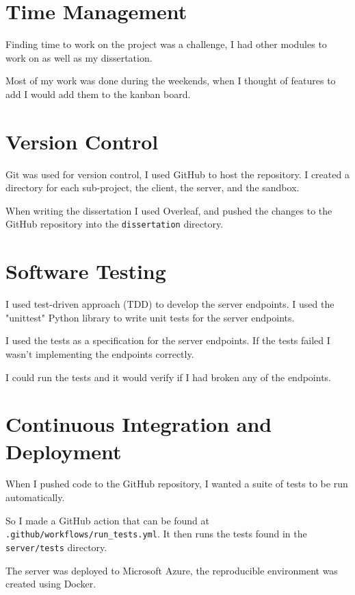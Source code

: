 
\section{Time Management}
Finding time to work on the project was a challenge,
I had other modules to work on as well as my dissertation.

Most of my work was done during the weekends,
when I thought of features to add I would add them to the kanban board.


\section{Version Control}
Git was used for version control, I used GitHub to host the repository.
I created a directory for each sub-project, the client, the server, and the sandbox.

When writing the dissertation I used Overleaf,
and pushed the changes to the GitHub repository into the \texttt{dissertation} directory.



\section{Software Testing}
I used test-driven approach (TDD) to develop the server endpoints.
I used the "unittest" Python library to write unit tests for the server endpoints.

I used the tests as a specification for the server endpoints.
If the tests failed I wasn't implementing the endpoints correctly.

I could run the tests and it would verify if I had broken any of the endpoints.


\section{Continuous Integration and Deployment}
When I pushed code to the GitHub repository,
I wanted a suite of tests to be run automatically.

So I made a GitHub action that can be found at
\texttt{.github/workflows/run\_tests.yml}.
It then runs the tests found in the \texttt{server/tests} directory.

The server was deployed to Microsoft Azure,
the reproducible environment was created using Docker.
